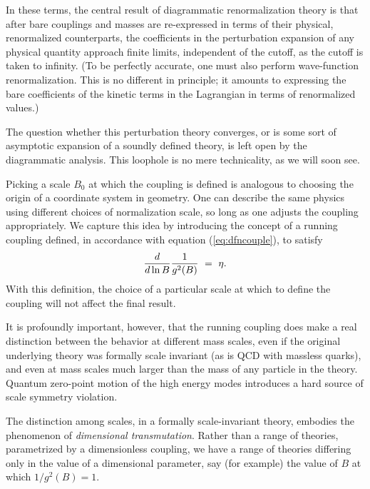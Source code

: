 \documentclass[12pt]{article}
\begin{document}
In these terms, the central
result of diagrammatic renormalization theory is that after bare
couplings and masses are re-expressed in terms of their physical,
renormalized counterparts, the coefficients in the perturbation
expansion of any physical quantity approach finite limits, independent
of the cutoff, as the cutoff is taken to infinity.  (To be perfectly
accurate, one must also perform wave-function renormalization.  This
is no different in principle; it amounts to expressing the bare
coefficients of the kinetic terms in the Lagrangian in terms of
renormalized values.)  

The question whether this perturbation
theory converges, or is some sort of asymptotic expansion of a soundly
defined theory, is left open by the diagrammatic analysis.  This
loophole is no mere technicality, as we will soon see.  

Picking a
scale $B_0$ at which the coupling is defined is analogous to choosing
the origin of a coordinate system in geometry.  One can describe the
same physics using different choices of normalization scale, so long
as one adjusts the coupling appropriately.  We capture this idea by
introducing the concept of a running coupling defined, in accordance with
equation (\ref{eq:dfncouple}), to satisfy
\begin{equation}{d\over d \ln B} {1\over g^2(B)} ~=~
\eta.\label{eq:running} 
\end{equation}
With this definition, the choice
of a particular scale at which to define the coupling will not affect
the final result.  

It is profoundly important, however, that the
running coupling does make a real distinction between the behavior at
different mass scales, even if the original underlying theory was
formally scale invariant (as is QCD with massless quarks), and even at
mass scales much larger than the mass of any particle in the theory.
Quantum zero-point motion of the high energy modes introduces a hard
source of scale symmetry violation.  

The distinction among scales, in
a formally scale-invariant theory, embodies the phenomenon of {\it
dimensional transmutation}.  Rather than a range of theories,
parametrized by a dimensionless coupling, we have a range of theories
differing only in the value of a dimensional parameter, say (for
example) the value of $B$ at which $1/g^2(B) = 1$.  
\end{document}
